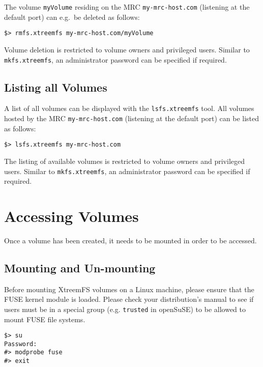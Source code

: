 \documentclass[a4paper,10pt]{book}
\begin{document}
The volume \texttt{myVolume} residing on the MRC \texttt{my-mrc-host.com} (listening at the default port) can e.g.\ be deleted as follows:

\begin{verbatim}
$> rmfs.xtreemfs my-mrc-host.com/myVolume
\end{verbatim}

Volume deletion is restricted to volume owners and privileged users. Similar to \texttt{mkfs.xtreemfs}, an administrator password can be specified if required.

\subsection{Listing all Volumes}

A list of all volumes can be displayed with the \texttt{lsfs.xtreemfs} tool. All volumes hosted by the MRC \texttt{my-mrc-host.com} (listening at the default port) can be listed as follows:

\begin{verbatim}
$> lsfs.xtreemfs my-mrc-host.com
\end{verbatim}

The listing of available volumes is restricted to volume owners and privileged users. Similar to \texttt{mkfs.xtreemfs}, an administrator password can be specified if required.

\section{Accessing Volumes}
\label{sec:mount_vol}

Once a volume has been created, it needs to be mounted in order to be accessed.

\subsection{Mounting and Un-mounting}

Before mounting XtreemFS volumes on a Linux machine, please ensure that the FUSE kernel module is loaded. Please check your distribution's manual to see if users must be in a special group (e.g. \texttt{trusted} in openSuSE) to be allowed to mount FUSE file systems.


\begin{verbatim}
$> su
Password:
#> modprobe fuse
#> exit
\end{verbatim}
\end{document}

